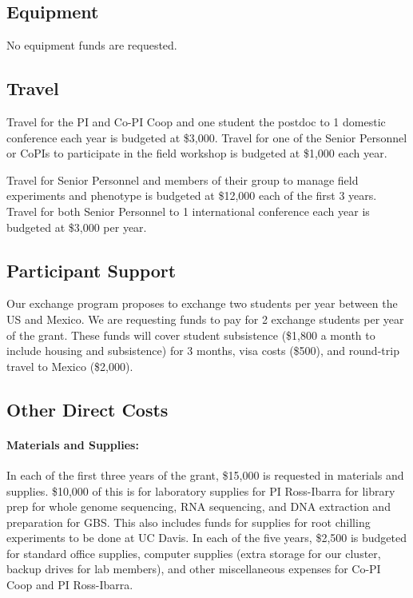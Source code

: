 \subsection*{Equipment}

No equipment funds are requested.

\subsection*{Travel}

Travel for the PI and Co-PI Coop and one student the postdoc to 1 domestic conference each year is budgeted at \$3,000.  Travel for one of the Senior Personnel or CoPIs to participate in the field workshop is budgeted at \$1,000 each year.

Travel for Senior Personnel and members of their group to manage field experiments and phenotype is budgeted at \$12,000 each of the first 3 years. Travel for both Senior Personnel to 1 international conference each year is budgeted at \$3,000 per year.

\subsection*{Participant Support}
Our exchange program proposes to exchange two students per year between the US and Mexico.  We are requesting funds to pay for 2 exchange students per year of the grant. These funds will cover student subsistence (\$1,800 a month to include housing and subsistence) for 3 months, visa costs (\$500), and round-trip travel to Mexico (\$2,000).

\subsection*{Other Direct Costs}

 \paragraph{Materials and Supplies:}
In each of the first three years of the grant, \$15,000 is requested in materials and supplies.  \$10,000 of this is for laboratory supplies for PI Ross-Ibarra for library prep for whole genome sequencing, RNA sequencing, and DNA extraction and preparation for GBS.  This also includes funds for supplies for root chilling experiments to be done at UC Davis.  In each of the five years, \$2,500 is budgeted for standard office supplies, computer supplies (extra storage for our cluster, backup drives for lab members), and other miscellaneous expenses for Co-PI Coop and PI Ross-Ibarra. 

